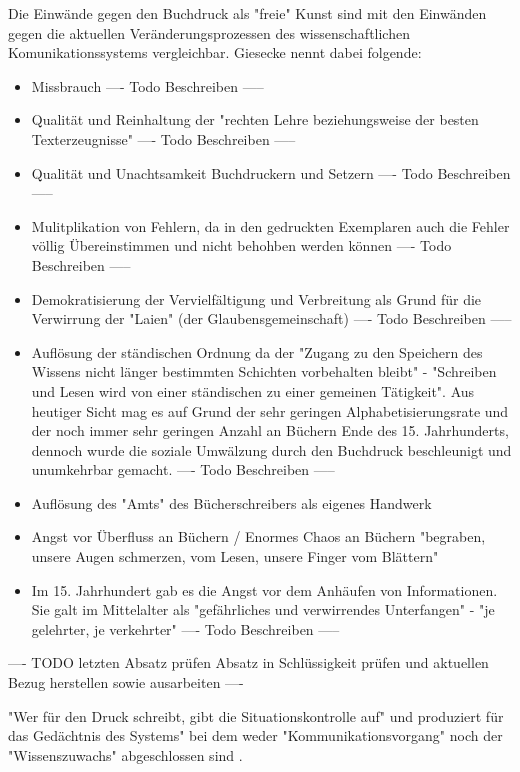 Die Einwände gegen den Buchdruck als "freie" Kunst \cite{giesecke_1991_buchdruck} sind mit den Einwänden gegen die aktuellen Veränderungsprozessen des wissenschaftlichen Komunikationssystems vergleichbar. Giesecke nennt dabei folgende:
\begin{itemize}
\item Missbrauch ---- Todo Beschreiben -----
\item Qualität und Reinhaltung der "rechten Lehre beziehungsweise der besten Texterzeugnisse" ---- Todo Beschreiben -----
\item Qualität und Unachtsamkeit Buchdruckern und Setzern ---- Todo Beschreiben -----
\item Mulitplikation von Fehlern, da in den gedruckten Exemplaren auch die Fehler völlig Übereinstimmen und nicht behohben werden können ---- Todo Beschreiben -----
\item Demokratisierung der Vervielfältigung und Verbreitung als Grund für die Verwirrung der "Laien" (der Glaubensgemeinschaft) ---- Todo Beschreiben -----
\item Auflösung der ständischen Ordnung
da der "Zugang zu den Speichern des Wissens nicht länger bestimmten Schichten vorbehalten bleibt" - "Schreiben und Lesen wird von einer ständischen zu einer gemeinen Tätigkeit". Aus heutiger Sicht mag es auf Grund der sehr geringen Alphabetisierungsrate und der noch immer sehr geringen Anzahl an Büchern Ende des 15. Jahrhunderts, dennoch wurde die soziale Umwälzung durch den Buchdruck beschleunigt und unumkehrbar gemacht. ---- Todo Beschreiben -----
\item Auflösung des "Amts" des Bücherschreibers als eigenes Handwerk
\item Angst vor Überfluss an Büchern / Enormes Chaos an Büchern "begraben, unsere
Augen schmerzen, vom Lesen, unsere Finger vom Blättern" \cite{giesecke_1991_buchdruck}
\item Im 15. Jahrhundert gab es die Angst vor dem Anhäufen von Informationen. Sie galt im Mittelalter als "gefährliches und verwirrendes Unterfangen" - "je gelehrter, je verkehrter" ---- Todo Beschreiben -----
\end{itemize}

---- TODO letzten Absatz prüfen Absatz in Schlüssigkeit prüfen und aktuellen Bezug herstellen sowie ausarbeiten ----

"Wer für den Druck schreibt, gibt die Situationskontrolle auf" und produziert für das Gedächtnis des Systems" bei dem weder "Kommunikationsvorgang" noch der "Wissenszuwachs" abgeschlossen sind \cite{Luhmann1998}. 

